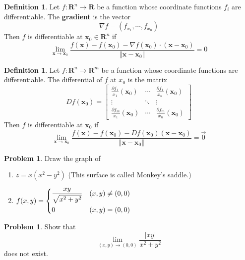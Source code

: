 \documentclass{beamer}
\theoremstyle{plain}
\theoremstyle{definition}
\newtheorem{defn}[thm]{Definition}
\newtheorem{prob}[thm]{Problem}
\begin{document}
\begin{frame}
\begin{defn}
	Let $f:\mathbf R^n\to\mathbf R$ be a function
	whose coordinate functions $f_i$ are differentiable.
	The \textbf{gradient} is the vector	
		\[\nabla f = (f_{x_1},\cdots,f_{x_n})\]
	Then $f$ is differentiable at 
	$\mathbf x_0\in\mathbf R^n$ if 
	$$\lim_{\mathbf x\to\mathbf x_0}
		\frac{f(\mathbf x) - f(\mathbf x_0) 
		- \nabla f(\mathbf x_0)
		\cdot(\mathbf x-\mathbf x_0)}
		{\Vert\mathbf x-\mathbf x_0\Vert} = 0$$
\end{defn}
\end{frame}

\begin{frame}
\begin{defn}
	Let $f:\mathbf R^n\to\mathbf R^m$ be a function
	whose coordinate functions are differentiable.
	The differential of $f$ at $x_0$ is the matrix
	$$Df(\mathbf x_0)
	 = \begin{bmatrix} 
	\frac{\partial f_1}{x_1}(\mathbf x_0) & \cdots 
		& \frac{\partial f_1}{x_n}(\mathbf x_0) \\
	\vdots & \ddots & \vdots \\
	\frac{\partial f_m}{x_1}(\mathbf x_0) & \cdots
		& \frac{\partial f_m}{x_n}(\mathbf x_0) 
	   \end{bmatrix}$$
	Then $f$ is differentiable at $\mathbf x_0$ if
	$$\lim_{\mathbf x\to\mathbf x_0}
	\frac{f(\mathbf x) - f(\mathbf x_0) 
	- Df(\mathbf x_0)
	(\mathbf x - \mathbf x_0)}
	{\Vert \mathbf x - \mathbf x_0\Vert} = \vec 0$$
\end{defn}	
\end{frame}

\begin{frame}
\begin{prob}
	Draw the graph of 
	\begin{enumerate}
	\item $z = x(x^2-y^2)$ 
	(This surface is called Monkey's saddle.)
	\item $f(x,y)=\begin{dcases}
	\frac{xy}{\sqrt{x^2+y^2}} & (x,y)\neq(0,0)\\
	0 & (x,y)=(0,0)\end{dcases}$
	\end{enumerate}
\end{prob}
\end{frame}

\begin{frame}
\begin{prob}
	Show that 
	\[\lim_{(x,y)\to(0,0)} \frac{|xy|}{x^2+y^2}\]
	does not exist.
\end{prob}
\end{frame}
\end{document}
